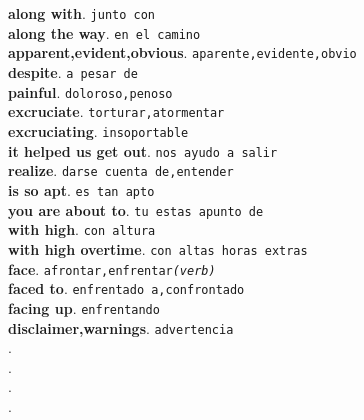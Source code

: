 \documentclass[twocolumn]{article}
\begin{document}
	\textsf{\textbf{along with}}. \texttt{junto con}\\
	\textsf{\textbf{along the way}}. \texttt{en el camino}\\
	\textsf{\textbf{apparent,evident,obvious}}. \texttt{aparente,evidente,obvio}\\
	\textsf{\textbf{despite}}. \texttt{a pesar de}\\
	\textsf{\textbf{painful}}. \texttt{doloroso,penoso}\\
	\textsf{\textbf{excruciate}}. \texttt{torturar,atormentar}\\
	\textsf{\textbf{excruciating}}. \texttt{insoportable}\\
	\textsf{\textbf{it helped us get out}}. \texttt{nos ayudo a salir}\\
	\textsf{\textbf{realize}}. \texttt{darse cuenta de,entender}\\
	\textsf{\textbf{is so apt}}. \texttt{es tan apto}\\
	\textsf{\textbf{you are about to}}. \texttt{tu estas apunto de}\\
	\textsf{\textbf{with high}}. \texttt{con altura}\\
	\textsf{\textbf{with high overtime}}. \texttt{con altas horas extras}\\
	\textsf{\textbf{face}}. \texttt{afrontar,enfrentar{\scriptsize \textsl{(verb)}}}\\
	\textsf{\textbf{faced to}}. \texttt{enfrentado a,confrontado}\\
	\textsf{\textbf{facing up}}. \texttt{enfrentando}\\
	\textsf{\textbf{disclaimer,warnings}}. \texttt{advertencia}\\
	\textsf{\textbf{}}. \texttt{}\\
	\textsf{\textbf{}}. \texttt{}\\
	\textsf{\textbf{}}. \texttt{}\\
	\textsf{\textbf{}}. \texttt{}\\
\end{document}
